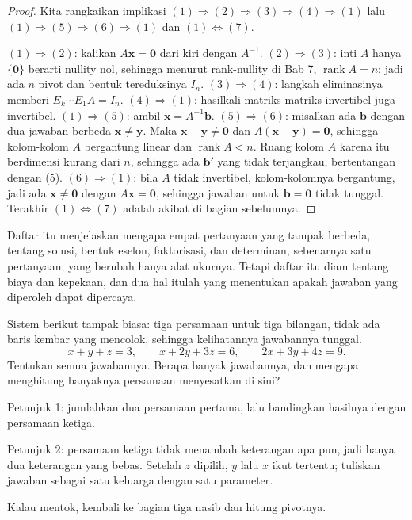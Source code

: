 \begin{proof}
Kita rangkaikan implikasi $(1)\Rightarrow(2)\Rightarrow(3)\Rightarrow(4)\Rightarrow(1)$
lalu $(1)\Rightarrow(5)\Rightarrow(6)\Rightarrow(1)$ dan $(1)\Leftrightarrow(7)$.

$(1)\Rightarrow(2)$: kalikan $A\mathbf{x}=\mathbf{0}$ dari kiri dengan $A^{-1}$.
$(2)\Rightarrow(3)$: inti $A$ hanya $\{\mathbf{0}\}$ berarti nullity nol, sehingga menurut
rank-nullity di Bab 7, $\operatorname{rank}A=n$; jadi ada $n$ pivot dan bentuk tereduksinya
$I_{n}$. $(3)\Rightarrow(4)$: langkah eliminasinya memberi
$E_{k}\cdots E_{1}A=I_{n}$. $(4)\Rightarrow(1)$: hasilkali matriks-matriks invertibel juga
invertibel.
$(1)\Rightarrow(5)$: ambil $\mathbf{x}=A^{-1}\mathbf{b}$. $(5)\Rightarrow(6)$: misalkan ada
$\mathbf{b}$ dengan dua jawaban berbeda $\mathbf{x}\neq\mathbf{y}$. Maka
$\mathbf{x}-\mathbf{y}\neq\mathbf{0}$ dan $A(\mathbf{x}-\mathbf{y})=\mathbf{0}$, sehingga
kolom-kolom $A$ bergantung linear dan $\operatorname{rank}A<n$. Ruang kolom $A$ karena itu
berdimensi kurang dari $n$, sehingga ada $\mathbf{b}'$ yang tidak terjangkau, bertentangan
dengan (5).
$(6)\Rightarrow(1)$: bila $A$ tidak invertibel, kolom-kolomnya bergantung, jadi ada
$\mathbf{x}\neq\mathbf{0}$ dengan $A\mathbf{x}=\mathbf{0}$, sehingga jawaban untuk
$\mathbf{b}=\mathbf{0}$ tidak tunggal. Terakhir $(1)\Leftrightarrow(7)$ adalah akibat di
bagian sebelumnya.
\end{proof}

Daftar itu menjelaskan mengapa empat pertanyaan yang tampak berbeda, tentang solusi, bentuk
eselon, faktorisasi, dan determinan, sebenarnya satu pertanyaan; yang berubah hanya alat
ukurnya. Tetapi daftar itu diam tentang biaya dan kepekaan, dan dua hal itulah yang menentukan
apakah jawaban yang diperoleh dapat dipercaya.

\begin{tantangan}
Sistem berikut tampak biasa: tiga persamaan untuk tiga bilangan, tidak ada baris kembar yang
mencolok, sehingga kelihatannya jawabannya tunggal.
\[
  x+y+z=3,\qquad x+2y+3z=6,\qquad 2x+3y+4z=9 .
\]
Tentukan semua jawabannya. Berapa banyak jawabannya, dan mengapa menghitung banyaknya
persamaan menyesatkan di sini?

Petunjuk 1: jumlahkan dua persamaan pertama, lalu bandingkan hasilnya dengan persamaan
ketiga.

Petunjuk 2: persamaan ketiga tidak menambah keterangan apa pun, jadi hanya dua keterangan
yang bebas. Setelah $z$ dipilih, $y$ lalu $x$ ikut tertentu; tuliskan jawaban sebagai satu
keluarga dengan satu parameter.

Kalau mentok, kembali ke bagian tiga nasib dan hitung pivotnya.
\end{tantangan}

